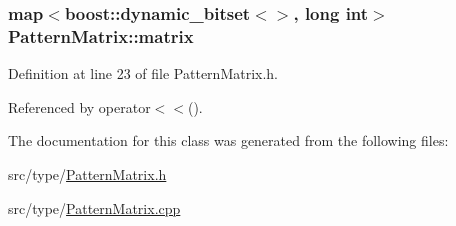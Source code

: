 \hypertarget{classPatternMatrix_a76f1df5cd70ae108794659aaf5c79ffc}{}
\subsubsection[{matrix}]{\setlength{\rightskip}{0pt plus 5cm}map$<$boost\+::dynamic\+\_\+bitset$<$$>$, long int$>$ Pattern\+Matrix\+::matrix\hspace{0.3cm}{\ttfamily [private]}}\label{classPatternMatrix_a76f1df5cd70ae108794659aaf5c79ffc}


Definition at line 23 of file Pattern\+Matrix.\+h.



Referenced by operator$<$$<$().



The documentation for this class was generated from the following files\+:\begin{DoxyCompactItemize}
\item 
src/type/\hyperlink{PatternMatrix_8h}{Pattern\+Matrix.\+h}\item 
src/type/\hyperlink{PatternMatrix_8cpp}{Pattern\+Matrix.\+cpp}\end{DoxyCompactItemize}
